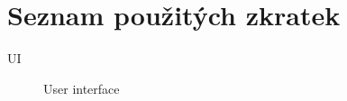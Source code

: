 \chapter{Seznam použitých zkratek}

\begin{description}
	\item[UI] User interface
\end{description}
